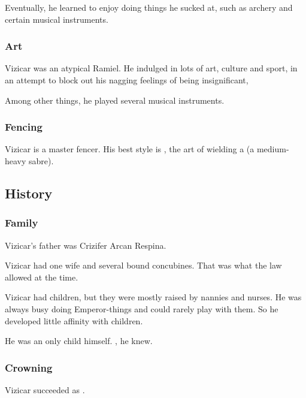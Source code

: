 Eventually, he learned to enjoy doing things he sucked at, such as archery and certain musical instruments. 





\subsubsection{Art}
Vizicar was an atypical Ramiel. 
He indulged in lots of art, culture and sport, in an attempt to block out his nagging feelings of being insignificant, 

Among other things, he played several musical instruments. 





\subsubsection{Fencing}
Vizicar is a master fencer. 
His best style is \chatresse, the art of wielding a \chandre{} (a medium-heavy sabre). 









\subsection{History}





\subsubsection{Family}
Vizicar's father was Crizifer Arcan Respina. 

Vizicar had one wife and several bound concubines. 
That was what the law allowed at the time. 

Vizicar had children, but they were mostly raised by nannies and nurses. 
He was always busy doing Emperor-things and could rarely play with them. 
So he developed little affinity with children. 

He was an only child himself. 
, he knew. 





\subsubsection{Crowning}
Vizicar succeeded \LucionRinOrcas{} as \VaimonCaliph. 





